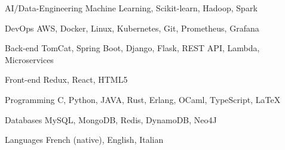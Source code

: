 

\begin{cvskills}

  \cvskill
    {AI/Data-Engineering} %
    {Machine Learning, Scikit-learn, Hadoop, Spark} %

  \cvskill
    {DevOps} %
    {AWS, Docker, Linux, Kubernetes, Git, Prometheus, Grafana} %

  \cvskill
    {Back-end} %
    {TomCat, Spring Boot, Django, Flask, REST API, Lambda, Microservices} %

  \cvskill
    {Front-end} %
    {Redux, React, HTML5} %

  \cvskill
    {Programming} %
    {C, Python, JAVA, Rust, Erlang, OCaml, TypeScript, LaTeX} %

  \cvskill
    {Databases} %
    {MySQL, MongoDB, Redis, DynamoDB, Neo4J} %

  \cvskill
    {Languages} %
    {French (native), English, Italian} %

\end{cvskills}
